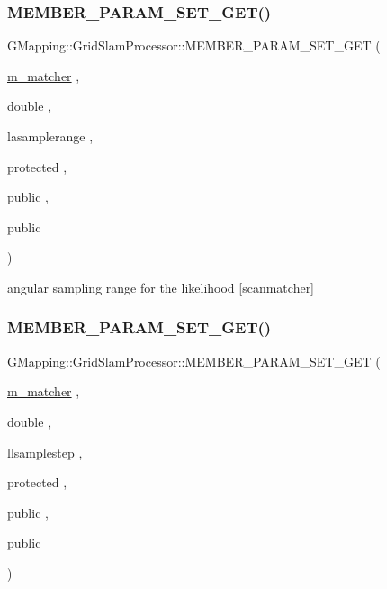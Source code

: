 \subsubsection{\texorpdfstring{M\+E\+M\+B\+E\+R\+\_\+\+P\+A\+R\+A\+M\+\_\+\+S\+E\+T\+\_\+\+G\+E\+T()}{MEMBER\_PARAM\_SET\_GET()}\hspace{0.1cm}{\footnotesize\ttfamily [11/16]}}
{\footnotesize\ttfamily G\+Mapping\+::\+Grid\+Slam\+Processor\+::\+M\+E\+M\+B\+E\+R\+\_\+\+P\+A\+R\+A\+M\+\_\+\+S\+E\+T\+\_\+\+G\+ET (\begin{DoxyParamCaption}\item[{\hyperlink{classGMapping_1_1GridSlamProcessor_ac50952d259590c4aeba22eee4e6437f5}{m\+\_\+matcher}}]{,  }\item[{double}]{,  }\item[{lasamplerange}]{,  }\item[{protected}]{,  }\item[{public}]{,  }\item[{public}]{ }\end{DoxyParamCaption})}

angular sampling range for the likelihood \mbox{[}scanmatcher\mbox{]} \mbox{\label{classGMapping_1_1GridSlamProcessor_a7a491940692ed37326fc746e27c687bc}} 
\subsubsection{\texorpdfstring{M\+E\+M\+B\+E\+R\+\_\+\+P\+A\+R\+A\+M\+\_\+\+S\+E\+T\+\_\+\+G\+E\+T()}{MEMBER\_PARAM\_SET\_GET()}\hspace{0.1cm}{\footnotesize\ttfamily [12/16]}}
{\footnotesize\ttfamily G\+Mapping\+::\+Grid\+Slam\+Processor\+::\+M\+E\+M\+B\+E\+R\+\_\+\+P\+A\+R\+A\+M\+\_\+\+S\+E\+T\+\_\+\+G\+ET (\begin{DoxyParamCaption}\item[{\hyperlink{classGMapping_1_1GridSlamProcessor_ac50952d259590c4aeba22eee4e6437f5}{m\+\_\+matcher}}]{,  }\item[{double}]{,  }\item[{llsamplestep}]{,  }\item[{protected}]{,  }\item[{public}]{,  }\item[{public}]{ }\end{DoxyParamCaption})}


